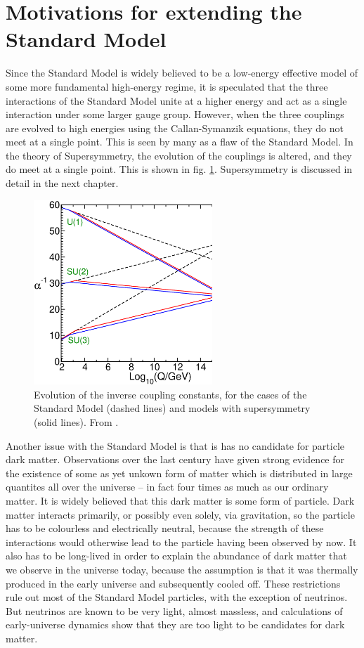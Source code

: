 \section{Motivations for extending the Standard Model}

Since the Standard Model is widely believed to be a low-energy effective model of some more fundamental high-energy regime, it is speculated that the three interactions of the Standard Model unite at a higher energy and act as a single interaction under some larger gauge group. However, when the three couplings are evolved to high energies using the Callan-Symanzik equations, they do not meet at a single point. This is seen by many as a flaw of the Standard Model. In the theory of Supersymmetry, the evolution of the couplings is altered, and they do meet at a single point. This is shown in fig. \ref{fig:coupling_unification}. Supersymmetry is discussed in detail in the next chapter.
\begin{figure}[hbt]
	\centering
	\includegraphics[width=0.6\textwidth]{figures/susyintro/unification.eps}
	\caption{Evolution of the inverse coupling constants, for the cases of the Standard Model (dashed lines) and models with supersymmetry (solid lines). From \cite{Martin:1997ns}.}
	\label{fig:coupling_unification}
\end{figure}

Another issue with the Standard Model is that is has no candidate for particle dark matter. Observations over the last century have given strong evidence for the existence of some as yet unkown form of matter which is distributed in large quantites all over the universe -- in fact four times as much as our ordinary matter. It is widely believed that this dark matter is some form of particle. Dark matter interacts primarily, or possibly even solely, via gravitation, so the particle has to be colourless and electrically neutral, because the strength of these interactions would otherwise lead to the particle having been observed by now. It also has to be long-lived in order to explain the abundance of dark matter that we observe in the universe today, because the assumption is that it was thermally produced in the early universe and subsequently cooled off. These restrictions rule out most of the Standard Model particles, with the exception of neutrinos. But neutrinos are known to be very light, almost massless, and calculations of early-universe dynamics show that they are too light to be candidates for dark matter. 

